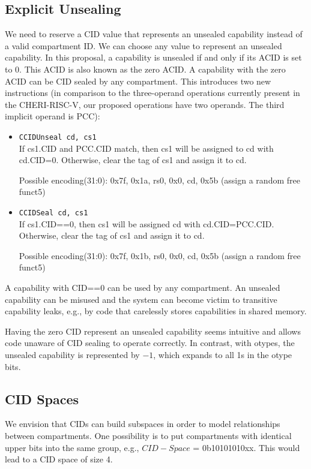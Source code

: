 \subsection{Explicit Unsealing}

We need to reserve a CID value that represents an unsealed capability instead of a valid compartment ID.
We can choose any value to represent an unsealed capability.
In this proposal, a capability is unsealed if and only if  its ACID is set to 0.
This ACID is also known as the zero ACID. A capability with the zero ACID can be CID sealed by any compartment.
This introduces two new instructions (in comparison to the three-operand operations currently present in the CHERI-RISC-V, our proposed operations have two operands. The third implicit operand is PCC):

\begin{itemize}
\item \texttt{CCIDUnseal cd, cs1}\\
If cs1.CID and PCC.CID match, then cs1 will be assigned to cd with cd.CID=0. Otherwise, clear the tag of cs1 and assign it to cd.

Possible encoding(31:0): 0x7f, 0x1a, rs0, 0x0, cd, 0x5b (assign a random free funct5)

\item \texttt{CCIDSeal cd, cs1}\\
If cs1.CID==0, then cs1 will be assigned cd with cd.CID=PCC.CID. Otherwise, clear the tag of cs1 and assign it to cd.

Possible encoding(31:0): 0x7f, 0x1b, rs0, 0x0, cd, 0x5b (assign a random free funct5)
\end{itemize}

A capability with CID==0 can be used by any compartment.
An unsealed capability can be misused and the system can become victim to transitive capability leaks, e.g., by code that carelessly stores capabilities in shared memory.

Having the zero CID represent an unsealed capability seems intuitive and allows code unaware of CID sealing to operate correctly.
In contrast, with otypes, the unsealed capability is represented by $-1$, which expands to all 1s in the otype bits.

\subsection{CID Spaces}
\label{app:exp:subsec:cid_spaces}

We envision that CIDs can build subspaces in order to model relationships between compartments.
One possibility is to put compartments with identical upper bits into the same group, e.g., $CID-Space$ = 0b10101010xx.
This would lead to a CID space of size 4.

